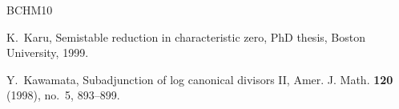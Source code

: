 \documentclass[12pt]{amsart}
\theoremstyle{definition}
\begin{document}
\begin{thebibliography}{BCHM10}











 K.~Karu, Semistable reduction in characteristic zero, PhD thesis, Boston University, 1999. 


Y.~Kawamata, Subadjunction of log canonical divisors II, Amer. J. Math. {\textbf{120}} (1998), no.~5, 893--899.














\end{thebibliography}
\end{document}
